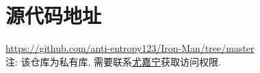 \chapter{源代码地址}

\url{https://github.com/anti-entropy123/Iron-Man/tree/master}
\\
注: 该仓库为私有库, 需要联系\href{https://github.com/anti-entropy123}{尤嘉宁}获取访问权限.